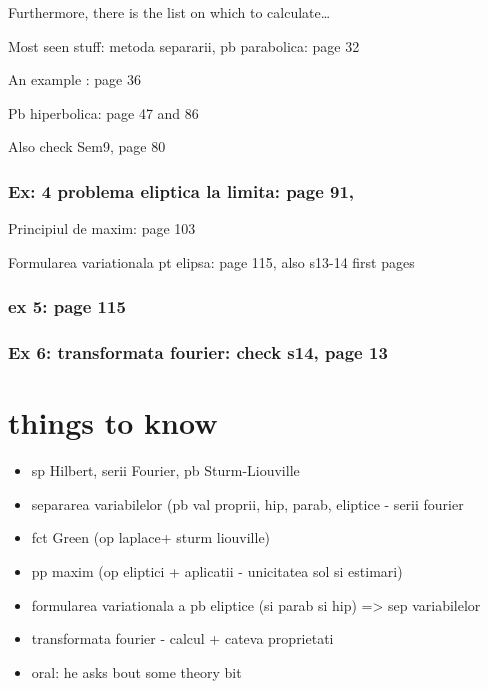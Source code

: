 \documentclass[11pt]{article}
\begin{document}
Furthermore, there is the list on which to calculate\ldots{}

Most seen stuff: metoda separarii, pb parabolica: page 32


An example : page 36


Pb hiperbolica: page 47 and 86

Also check Sem9, page 80

\subsubsection*{Ex: 4 problema eliptica la limita: page 91,}
\label{sec:org2cecd06}

Principiul de maxim: page 103

Formularea variationala pt elipsa: page 115, also s13-14 first pages

\subsubsection*{ex 5: page 115}
\label{sec:orgc150b55}
\subsubsection*{Ex 6: transformata fourier: check s14, page 13}
\label{sec:orgd22a09f}

\section*{things to know}
\label{sec:org76267a3}
\begin{itemize}
\item sp Hilbert, serii Fourier, pb Sturm-Liouville
\item separarea variabilelor (pb val proprii, hip, parab, eliptice - serii fourier
\item fct Green (op laplace+ sturm liouville)
\item pp maxim (op eliptici + aplicatii - unicitatea sol si estimari)
\item formularea variationala a pb eliptice (si parab si hip) => sep variabilelor
\item transformata fourier - calcul + cateva proprietati

\item oral: he asks bout some theory bit
\end{itemize}
\end{document}
